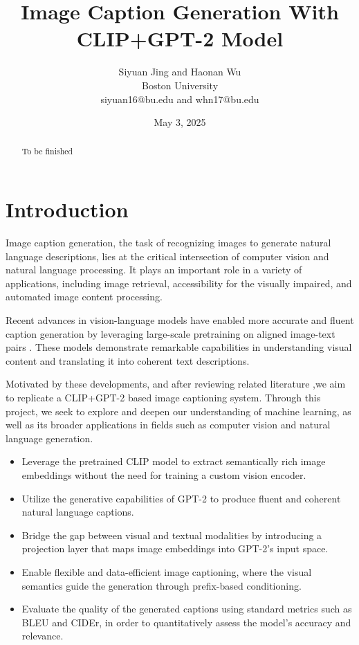 \documentclass[11pt]{article}
\begin{document}
\title{Image Caption Generation With CLIP+GPT-2 Model}
\author{Siyuan Jing and Haonan Wu\\ Boston University \\ siyuan16@bu.edu and whn17@bu.edu}
\date{May 3, 2025}
\maketitle

\begin{abstract}
To be finished
\end{abstract}

\section{Introduction}
Image caption generation, the task of recognizing images to generate natural language descriptions, lies at the critical intersection of 
computer vision and natural language processing. 
It plays an important role in a variety of applications, including image retrieval, accessibility for the visually impaired, and automated image content processing.

Recent advances in vision-language models have enabled more accurate and 
fluent caption generation by leveraging large-scale pretraining on aligned image-text pairs 
. These models demonstrate remarkable capabilities in understanding visual content and 
translating it into coherent text descriptions.

Motivated by these developments, and after reviewing related 
literature \cite{Nukrai2022},we aim to replicate a CLIP+GPT-2 based 
image captioning system. Through this project, we seek to explore and deepen our understanding of 
machine learning, as well as its broader applications in fields such as computer vision and natural language generation.
\begin{itemize}
    \item Leverage the pretrained CLIP model to extract semantically rich image embeddings without the need for training a custom vision encoder.
    \item Utilize the generative capabilities of GPT-2 to produce fluent and coherent natural language captions.
    \item Bridge the gap between visual and textual modalities by introducing a projection layer that maps image embeddings into GPT-2's input space.
    \item Enable flexible and data-efficient image captioning, where the visual semantics guide the generation through prefix-based conditioning.
    \item Evaluate the quality of the generated captions using standard metrics such as BLEU and CIDEr, in order to quantitatively assess the model's accuracy and relevance.
\end{itemize}
\pagebreak
\end{document}
